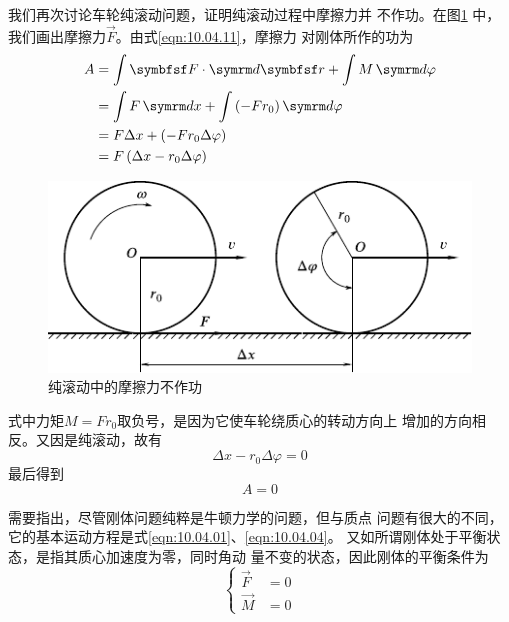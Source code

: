 我们再次讨论车轮纯滚动问题，证明纯滚动过程中摩擦力并
不作功。在图\ref{fig:10.13} 中，我们画出摩擦力$\vec{F}$。由式\eqref{eqn:10.04.11}，摩擦力
对刚体所作的功为
\begin{equation*}
  \begin{split}
    A &= \int \vec{ F } \cdot \dif \vec{r} + \int M \dif \varphi \\
    &= \int F \dif x + \int \left( - F r _ { 0 } \right) \dif \varphi \\
    &= F \Delta x + \left( - F r _ { 0 } \Delta \varphi \right) \\%
    &= F \left( \Delta x - r _ { 0 } \Delta \varphi \right)
  \end{split}
\end{equation*}

\clearpage
\begin{figure}[h]
  \centering
  \includegraphics{figure/fig10.13}
  \caption{纯滚动中的摩擦力不作功}
  \label{fig:10.13}
\end{figure}
式中力矩$ M = F r _ { 0 } $取负号，是因为它使车轮绕质心的转动方向上
增加的方向相反。又因是纯滚动，故有
\begin{equation*}
  \Delta x - r _ { 0 } \Delta \varphi = 0
\end{equation*}
最后得到
\begin{equation*}
  A = 0
\end{equation*}

需要指出，尽管刚体问题纯粹是牛顿力学的问题，但与质点
问题有很大的不同，它的基本运动方程是式\eqref{eqn:10.04.01}、\eqref{eqn:10.04.04}。
又如所谓刚体处于平衡状态，是指其质心加速度为零，同时角动
量不变的状态，因此刚体的平衡条件为
\begin{equation}\label{eqn:10.04.12}
  \begin{cases}
    \vec{ F } & = 0 \\
    \vec{ M } & = 0
  \end{cases}
\end{equation}


